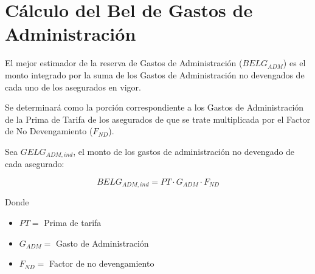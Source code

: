 \documentclass[11pt,twoside,openright,spanish]{report}
\numberwithin{equation}{chapter}
\numberwithin{figure}{chapter}
\numberwithin{table}{chapter}
\begin{document}
	 
	\section{Cálculo del Bel de Gastos de Administración}
	 
	El mejor estimador de la reserva de Gastos de Administración ($BELG_{ADM}$) es el monto integrado por la suma de los Gastos de Administración no devengados de cada uno de los asegurados en vigor.
	
	 
	
	Se determinará como la porción correspondiente a los Gastos de Administración de la Prima de Tarifa de los asegurados de que se trate multiplicada por el Factor de No Devengamiento ($F_{ND}$). 
\begin{comment}
Para Salud Individual Dental, se tomara el porcentaje de gasto de administración del mercado proporcionado por la Comisión Nacional de Seguros y Fianzas.
\end{comment}	
	 
	
	Sea $GELG_{ADM,ind}$, el monto de los gastos de administración no devengado de cada asegurado:
	
	 

\begin{comment}	
$
BELG_{ADM,ind}=\begin{cases}
PT \cdot G_{ADM} \cdot F_{ND}, & \text{$g \neq Salud  Dental  Individual$}.\\
PT \cdot \alpha_{i} \cdot F_{ND}, & \text{$g = Salud  Dental  Individual$}.
\end{cases}
$
\end{comment}

\begin{equation}
BELG_{ADM,ind}=	PT \cdot G_{ADM} \cdot F_{ND}
\label{eq10}
\end{equation}



	Donde
	 
		\begin{itemize}
		\setlength\itemsep{-0.5em}
    \item $PT=$ Prima de tarifa
    
    \item $G_{ADM}^{}=$ Gasto de Administración
	
	\item $F_{ND}^{}=$ Factor de no devengamiento
	\end{itemize}
	
\begin{comment}	
	$\alpha_{i}^{}=$ Porcentaje de gasto de administración con información de Mercado
\end{comment}	
	 
\end{document}
